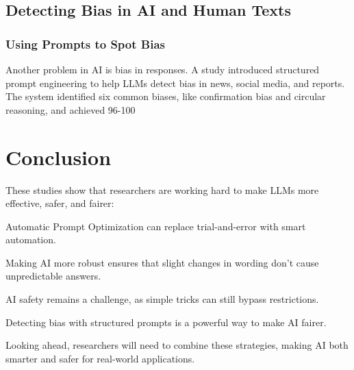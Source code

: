 \documentclass[a4paper,12pt]{article}
\begin{document}
\subsection{Detecting Bias in AI and Human Texts}
\subsubsection{Using Prompts to Spot Bias}
Another problem in AI is bias in responses. A study introduced structured prompt engineering to help LLMs detect bias in news, social media, and reports. The system identified six common biases, like confirmation bias and circular reasoning, and achieved 96-100%

\section{Conclusion}
These studies show that researchers are working hard to make LLMs more effective, safer, and fairer:

Automatic Prompt Optimization can replace trial-and-error with smart automation.

Making AI more robust ensures that slight changes in wording don’t cause unpredictable answers.

AI safety remains a challenge, as simple tricks can still bypass restrictions.

Detecting bias with structured prompts is a powerful way to make AI fairer.

Looking ahead, researchers will need to combine these strategies, making AI both smarter and safer for real-world applications.
\end{document}
